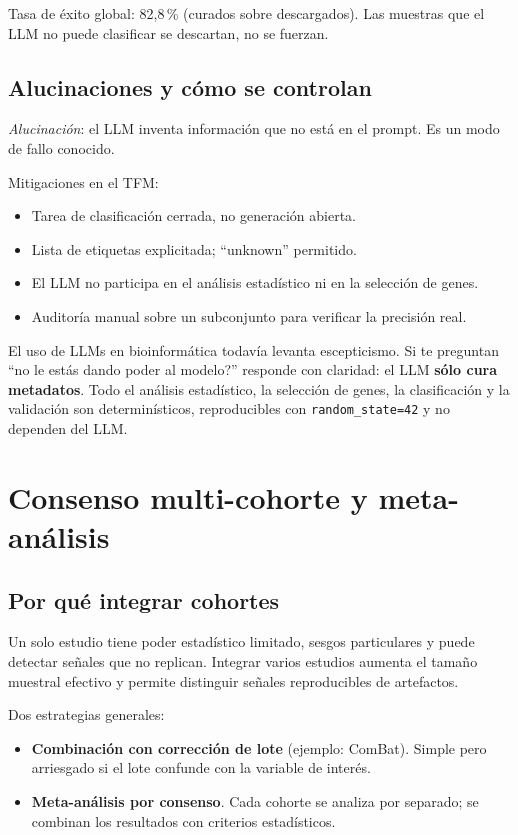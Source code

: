 \documentclass[11pt, a4paper]{article}
\begin{document}
Tasa de \'exito global: 82,8\,\% (curados sobre descargados). Las
muestras que el LLM no puede clasificar se descartan, no se fuerzan.

\subsection{Alucinaciones y c\'omo se controlan}

\emph{Alucinaci\'on}: el LLM inventa informaci\'on que no est\'a en el
prompt. Es un modo de fallo conocido.

Mitigaciones en el TFM:
\begin{itemize}[leftmargin=1.2em]
  \item Tarea de clasificaci\'on cerrada, no generaci\'on abierta.
  \item Lista de etiquetas explicitada; ``unknown'' permitido.
  \item El LLM no participa en el an\'alisis estad\'istico ni en la
  selecci\'on de genes.
  \item Auditor\'ia manual sobre un subconjunto para verificar la
  precisi\'on real.
\end{itemize}

\begin{peligro}
El uso de LLMs en bioinform\'atica todav\'ia levanta escepticismo. Si te
preguntan ``no le est\'as dando poder al modelo?'' responde con claridad:
el LLM \textbf{s\'olo cura metadatos}. Todo el an\'alisis estad\'istico,
la selecci\'on de genes, la clasificaci\'on y la validaci\'on son
determin\'isticos, reproducibles con \texttt{random\_state=42} y no
dependen del LLM.
\end{peligro}

\section{Consenso multi-cohorte y meta-an\'alisis}

\subsection{Por qu\'e integrar cohortes}

Un solo estudio tiene poder estad\'istico limitado, sesgos particulares y
puede detectar se\~nales que no replican. Integrar varios estudios
aumenta el tama\~no muestral efectivo y permite distinguir se\~nales
reproducibles de artefactos.

Dos estrategias generales:
\begin{itemize}[leftmargin=1.2em]
  \item \textbf{Combinaci\'on con correcci\'on de lote} (ejemplo: ComBat).
  Simple pero arriesgado si el lote confunde con la variable de inter\'es.
  \item \textbf{Meta-an\'alisis por consenso}. Cada cohorte se analiza
  por separado; se combinan los resultados con criterios estad\'isticos.
\end{itemize}
\end{document}
